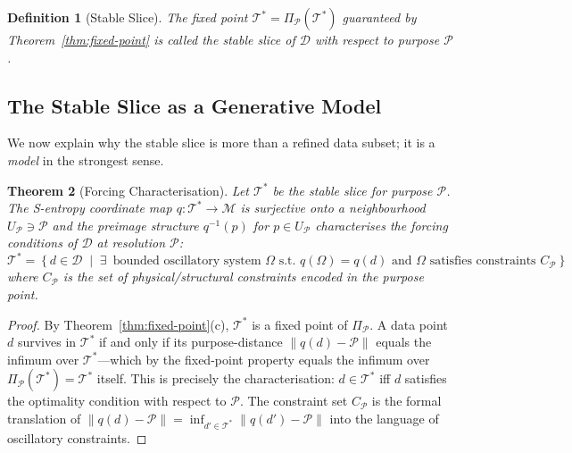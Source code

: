 \documentclass[10pt,twocolumn]{article}
\newtheorem{theorem}{Theorem}[section]
\newtheorem{definition}[theorem]{Definition}
\newcommand{\ProbeOp}{\Pi_\mathcal{P}}
\newcommand{\TruthCell}{\mathcal{T}}
\newcommand{\PurposePoint}{\mathcal{P}}
\newcommand{\DataSpace}{\mathcal{D}}
\newcommand{\ManifoldM}{\mathcal{M}}
\begin{document}
\begin{definition}[Stable Slice]
The fixed point $\TruthCell^* = \ProbeOp(\TruthCell^*)$ guaranteed by
Theorem~\ref{thm:fixed-point} is called the \emph{stable slice} of $\DataSpace$
with respect to purpose $\PurposePoint$.
\end{definition}

\subsection{The Stable Slice as a Generative Model}

We now explain why the stable slice is more than a refined data subset;
it is a \emph{model} in the strongest sense.

\begin{theorem}[Forcing Characterisation]
\label{thm:forcing}
Let $\TruthCell^*$ be the stable slice for purpose $\PurposePoint$.
The S-entropy coordinate map $q : \TruthCell^* \to \ManifoldM$ is surjective
onto a neighbourhood $U_\PurposePoint \ni \PurposePoint$ and
the preimage structure $q^{-1}(p)$ for $p \in U_\PurposePoint$ characterises
the \emph{forcing conditions} of $\DataSpace$ at resolution $\PurposePoint$:
\begin{equation}
\TruthCell^* = \left\{ d \in \DataSpace \;\middle|\;
  \exists\, \text{ bounded oscillatory system } \Omega \text{ s.t. } q(\Omega) = q(d) \text{ and } \Omega \text{ satisfies constraints } C_\PurposePoint
\right\}
\label{eq:forcing}
\end{equation}
where $C_\PurposePoint$ is the set of physical/structural constraints
encoded in the purpose point.
\end{theorem}

\begin{proof}
By Theorem~\ref{thm:fixed-point}(c), $\TruthCell^*$ is a fixed point of $\ProbeOp$.
A data point $d$ survives in $\TruthCell^*$ if and only if its purpose-distance
$\|q(d) - \PurposePoint\|$ equals the infimum over $\TruthCell^*$---which by
the fixed-point property equals the infimum over $\ProbeOp(\TruthCell^*) = \TruthCell^*$
itself. This is precisely the characterisation: $d \in \TruthCell^*$ iff
$d$ satisfies the optimality condition with respect to $\PurposePoint$.
The constraint set $C_\PurposePoint$ is the formal translation of
$\|q(d) - \PurposePoint\| = \inf_{d' \in \TruthCell^*} \|q(d') - \PurposePoint\|$
into the language of oscillatory constraints.
\end{proof}
\end{document}
